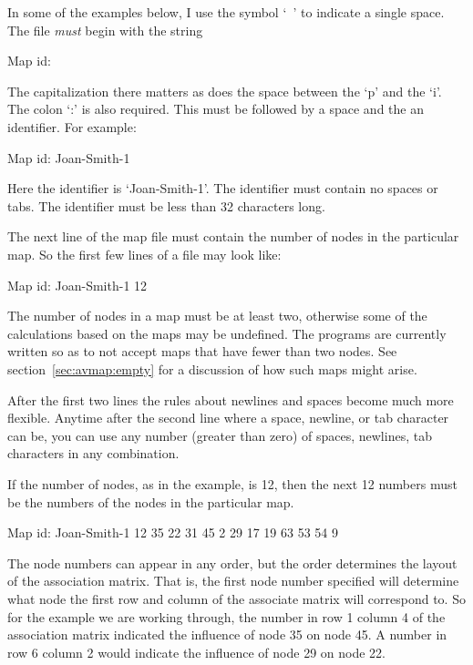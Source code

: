\documentclass[%
	11pt,
        a4paper,
        twoside]{workrep}
\begin{document}
In some of the examples below, I use the symbol `\verb*| |' to indicate
a single space.
The file \emph{must} begin with the string

\begin{verbatim*}
Map id:
\end{verbatim*}

The capitalization there matters as does the space between the `p'
and the `i'.  The colon `:' is also required.  This must be followed
by a space and the an identifier.  For example:

\begin{verbatim*}
Map id: Joan-Smith-1
\end{verbatim*}
Here the identifier is `Joan-Smith-1'.  The identifier must contain
no spaces or tabs.  The identifier must be less than 32 characters
long.

The next line of the map file must contain the number of nodes in the
particular map.  So the first few lines of a file may look like:
\begin{verbatim*}
Map id: Joan-Smith-1
12
\end{verbatim*}
The number of nodes in a map must be at least two, otherwise some
of the calculations based on the maps may be undefined.  The
programs are currently written so as to not accept maps that have
fewer than two nodes.  See section~\ref{sec:avmap:empty} for a discussion
of how such maps might arise.

After the first two lines the rules about newlines and spaces become
much more flexible.  Anytime after the second line where a space,
newline, or tab character can be, you can use any number (greater
than zero) of spaces, newlines, tab characters in any combination.

If the number of nodes, as in the example, is 12, then the next 12
numbers must be the numbers of the nodes in the particular map.

\begin{verbatim*}
Map id: Joan-Smith-1
12
35 22 31 45  2 29 17 19 63 53 54  9
\end{verbatim*}

The node numbers can appear in any order, but the order determines
the layout of the association matrix.  That is, the first node number
specified will determine what node the first row and column of the
associate matrix will correspond to.  So for the example we are
working through, the number in row 1 column 4 of the association
matrix indicated the influence of node 35 on node 45.  A number in
row 6 column 2 would indicate the influence of node 29 on node 22.
\end{document}

